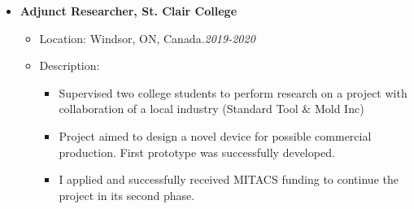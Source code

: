 \begin {itemize}
\begin {itemize}
\begin {itemize}
\begin {itemize}
                         \end {itemize}
            \end {itemize} \vspace{0.3cm}    
     \item [$\bullet$] \bf {\mtf \normalsize Adjunct Researcher, St. Clair College} \mdseries
                  \begin {itemize}
                \item [-]  {  Location:  Windsor, ON, Canada.\small \hspace{5.4cm}\textit{2019-2020}\normalsize} 
                \item [-]   {   Description:} 
                         \begin {itemize}
                                \item [\textbullet]  Supervised two college students to perform research on a project with collaboration of a local industry (Standard Tool $\&$ Mold Inc)
                               \item [\textbullet] Project aimed to design a novel device for possible commercial production. First prototype was successfully developed.
                               \item [\textbullet] I applied and successfully received MITACS funding to continue the project in its second phase. 
                         \end {itemize}
            \end {itemize} \vspace{0.3cm}        
    \end {itemize}
\end {itemize}


















